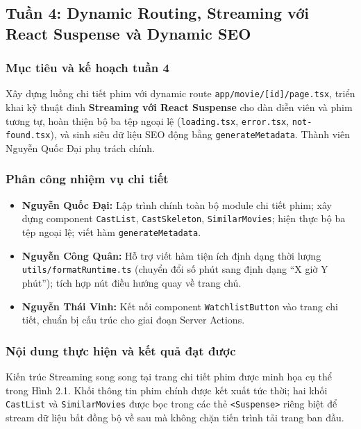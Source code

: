\documentclass[13pt,a4paper]{extarticle}
\begin{document}
\subsection{Tuần 4: Dynamic Routing, Streaming với React Suspense và Dynamic SEO}

\subsubsection{Mục tiêu và kế hoạch tuần 4}
Xây dựng luồng chi tiết phim với dynamic route \texttt{app/movie/[id]/page.tsx}, triển khai kỹ thuật đinh \textbf{Streaming với React Suspense} cho dàn diễn viên và phim tương tự, hoàn thiện bộ ba tệp ngoại lệ (\texttt{loading.tsx}, \texttt{error.tsx}, \texttt{not-found.tsx}), và sinh siêu dữ liệu SEO động bằng \texttt{generateMetadata}. Thành viên Nguyễn Quốc Đại phụ trách chính.

\subsubsection{Phân công nhiệm vụ chi tiết}
\begin{itemize}[noitemsep]
    \item \textbf{Nguyễn Quốc Đại:} Lập trình chính toàn bộ module chi tiết phim; xây dựng component \texttt{CastList}, \texttt{CastSkeleton}, \texttt{SimilarMovies}; hiện thực bộ ba tệp ngoại lệ; viết hàm \texttt{generateMetadata}.
    \item \textbf{Nguyễn Công Quân:} Hỗ trợ viết hàm tiện ích định dạng thời lượng \texttt{utils/formatRuntime.ts} (chuyển đổi số phút sang định dạng ``X giờ Y phút''); tích hợp nút điều hướng quay về trang chủ.
    \item \textbf{Nguyễn Thái Vinh:} Kết nối component \texttt{WatchlistButton} vào trang chi tiết, chuẩn bị cấu trúc cho giai đoạn Server Actions.
\end{itemize}

\subsubsection{Nội dung thực hiện và kết quả đạt được}
Kiến trúc Streaming song song tại trang chi tiết phim được minh họa cụ thể trong Hình 2.1. Khối thông tin phim chính được kết xuất tức thời; hai khối \texttt{CastList} và \texttt{SimilarMovies} được bọc trong các thẻ \texttt{<Suspense>} riêng biệt để stream dữ liệu bất đồng bộ về sau mà không chặn tiến trình tải trang ban đầu.
\end{document}
